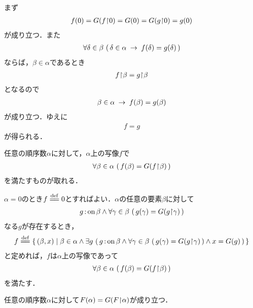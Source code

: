 	まず
	\begin{align}
		f(0) = G(f\hspace{-0.25em}\upharpoonright\hspace{-0.25em}{0}) = G(0) = G(g\hspace{-0.25em}\upharpoonright\hspace{-0.25em}{0}) = g(0)
	\end{align}
	が成り立つ．また
	\begin{align}
		\forall \delta \in \beta\, \left(\, 
		\delta \in \alpha \hspace{0.25em}\rightarrow\hspace{0.25em} f(\delta) = g(\delta)\, \right)
	\end{align}
	ならば，$\beta \in \alpha$であるとき
	\begin{align}
		f\hspace{-0.25em}\upharpoonright\hspace{-0.25em}{\beta} = g\hspace{-0.25em}\upharpoonright\hspace{-0.25em}{\beta}
	\end{align}
	となるので
	\begin{align}
		\beta \in \alpha \hspace{0.25em}\rightarrow\hspace{0.25em} f(\beta) = g(\beta)
	\end{align}
	が成り立つ．ゆえに
	\begin{align}
		f = g
	\end{align}
	が得られる．
	
	\begin{screen}
		任意の順序数$\alpha$に対して，$\alpha$上の写像$f$で
		\begin{align}
			\forall \beta \in \alpha\, \left(\, 
			f(\beta) = G(f\hspace{-0.25em}\upharpoonright\hspace{-0.25em}{\beta})\, \right)
		\end{align}
		を満たすものが取れる．
	\end{screen}
	
	$\alpha = 0$のとき$f \defeq 0$とすればよい．$\alpha$の任意の要素$\beta$に対して
	\begin{align}
		g \operatorname*{:on} \beta \wedge \forall \gamma\in \beta\, \left(\, 
		g(\gamma) = G(g\hspace{-0.25em}\upharpoonright\hspace{-0.25em}{\gamma})\, \right)
	\end{align}
	なる$g$が存在するとき，
	\begin{align}
		f \defeq \Set{(\beta,x)}{\beta \in \alpha \wedge
		\exists g\, \left(\, g \fon \beta \wedge
		\forall \gamma \in \beta\, \left(\, g(\gamma) = G(\rest{g}{\gamma})\, \right)
		\wedge x = G(g)\, \right)}
	\end{align}
	と定めれば，$f$は$\alpha$上の写像であって
	\begin{align}
		\forall \beta \in \alpha\, \left(\, 
		f(\beta) = G(f\hspace{-0.25em}\upharpoonright\hspace{-0.25em}{\beta})\, \right)
	\end{align}
	を満たす．
	
	\begin{screen}
		任意の順序数$\alpha$に対して$F(\alpha) = G(F\hspace{-0.25em}\upharpoonright\hspace{-0.25em}{\alpha})$が成り立つ．
	\end{screen}
	
